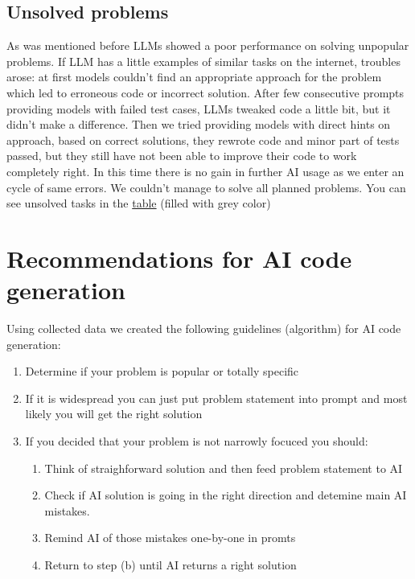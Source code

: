 \documentclass[12pt]{report}
\begin{document}
	\subsection{Unsolved problems}
		\qquad As was mentioned before LLMs showed a poor performance on solving unpopular problems. If LLM has a little examples of similar tasks on the internet, troubles arose: at first models couldn't find an appropriate approach for the problem which led to erroneous code or incorrect solution. After few consecutive prompts providing models with failed test cases, LLMs tweaked code a little bit, but it didn't make a difference. Then we tried providing models with direct hints on approach, based on correct solutions, they rewrote code and minor part of tests passed, but they still have not been able to improve their code to work completely right. In this time there is no gain in further AI usage as we enter an cycle of same errors. We couldn't manage to solve all planned problems. You can see unsolved tasks in the \href{https://docs.google.com/spreadsheets/d/1qXPyAJsOOpmtxIoGqObwG5mTaLU3IWO0SQRGbjZPhEc/edit#gid=0}{table} (filled with grey color) 
	
	\section{Recommendations for AI code generation}
		\qquad Using collected data we created the following guidelines (algorithm) for AI code generation:
		
		\begin{enumerate}
			\item Determine if your problem is popular or totally specific
			\item If it is widespread you can just put problem statement into prompt and most likely you will get the right solution
			\item If you decided that your problem is not narrowly focuced you should:
			\begin{enumerate}
				\item Think of straighforward solution and then feed problem statement to AI
				\item Check if AI solution is going in the right direction and detemine main AI mistakes.
				\item Remind AI of those mistakes one-by-one in promts 
				\item Return to step (b) until AI returns a right solution
			\end{enumerate}
		\end{enumerate}
		
\end{document}
